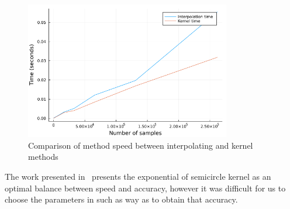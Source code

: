 \begin{figure}[htpb]
    \centering
    \includegraphics[width=0.8\textwidth]{images/speed.png}
    \caption{Comparison of method speed between interpolating and kernel methods}
    \label{fig:images-speed-png}
\end{figure}

The work presented in~\cite{IEEE-2021-Barnett} presents the exponential of semicircle kernel as an optimal balance between speed and accuracy, however it was difficult for us to choose the parameters in such as way as to obtain that accuracy.